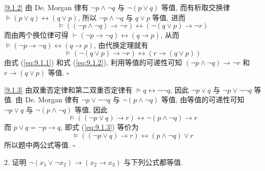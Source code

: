 \documentclass[boxes]{homework}
\begin{document}
\begin{solution}
    \ref{9.1.2} 由 De. Morgan 律有 $\lnot p\land\lnot q$ 与 $\lnot(p\lor q)$ 等值, 而有析取交换律 $\vDash (p\lor q)\leftrightarrow(q\lor p)$, 所以 $\lnot p\land\lnot q$ 与 $q\lor p$ 等值, 进而
    \begin{equation}\label{eq:9.1.1}
        \vDash ((\lnot p\land\lnot q)\to \lnot r)\leftrightarrow(\lnot(q\lor p)\to \lnot r)
    \end{equation}
    而由两个换位律可得 $\vdash (\lnot p\to\lnot q)\leftrightarrow(q\to p)$, 从而 $\vDash (\lnot p\to\lnot q)\leftrightarrow(q\to p)$, 由代换定理就有
    \begin{equation}\label{eq:9.1.2}
        \vDash (\lnot(q\lor p)\to \lnot r)\leftrightarrow(r\to(q\lor p))
    \end{equation}
    由式 (\ref{eq:9.1.1}) 和式 (\ref{eq:9.1.2}), 利用等值的可递性可知 $(\lnot p\land \lnot q)\to\lnot r$ 和 $r\to (q\lor p)$ 等值. $\square$

    \ref{9.1.3} 由双重否定律和第二双重否定律有 $\vDash q\leftrightarrow\lnot\lnot q$, 因此 $\lnot p\lor q$ 与 $\lnot p\lor \lnot\lnot q$ 等值. 由 De. Morgan 律有 $\lnot p\lor \lnot\lnot q$ 与 $\lnot (p\land \lnot q)$ 等值, 由等值的可递性可知 $\lnot p\lor q$ 与 $\lnot(p\land \lnot q)$ 等值, 因此
    \begin{equation}\label{eq:9.1.3}
        \vDash ((\lnot p\lor q)\to r)\leftrightarrow \lnot(p\land\lnot q)\to r
    \end{equation}
    而 $p\lor q = \lnot p\to q$, 即式 (\ref{eq:9.1.3}) 等价为
    \begin{equation}
        \vDash ((\lnot p\lor q)\to r)\leftrightarrow (p\land\lnot q)\lor r
    \end{equation}
    所以题中两公式等值. $\square$
\end{solution}
\begin{problem}
2. 证明 $\lnot (x_1\lor \lnot x_2)\to (x_2\to x_3)$ 与下列公式都等值.
\end{problem}
\end{document}
